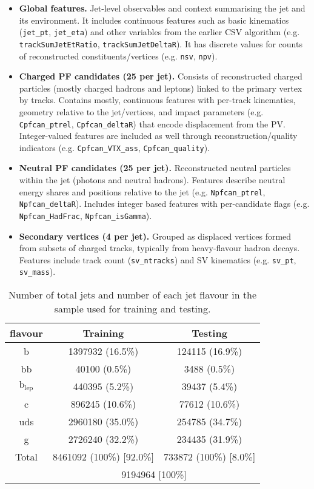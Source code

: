 \begin{itemize}
  \item \textbf{Global features.} Jet-level observables and context summarising the jet and its environment. It includes continuous features such as basic kinematics (\texttt{jet\_pt}, \texttt{jet\_eta}) and other variables from the earlier CSV algorithm (e.g. \texttt{trackSumJetEtRatio}, \texttt{trackSumJetDeltaR}). It has discrete values for counts of reconstructed constituents/vertices (e.g. \texttt{nsv}, \texttt{npv}).
  \item \textbf{Charged PF candidates (25 per jet).} Consists of reconstructed charged particles (mostly charged hadrons and leptons) linked to the primary vertex by tracks. Contains mostly, continuous features with per-track kinematics, geometry relative to the jet/vertices, and impact parameters (e.g. \texttt{Cpfcan\_ptrel},  \texttt{Cpfcan\_deltaR}) that encode displacement from the PV. Integer-valued features are included as well through reconstruction/quality indicators (e.g. \texttt{Cpfcan\_VTX\_ass}, \texttt{Cpfcan\_quality}).
  \item \textbf{Neutral PF candidates (25 per jet).} Reconstructed neutral particles within the jet (photons and neutral hadrons). Features describe neutral energy shares and positions relative to the jet (e.g. \texttt{Npfcan\_ptrel}, \texttt{Npfcan\_deltaR}). Includes integer based features with per-candidate flags (e.g. \texttt{Npfcan\_HadFrac}, \texttt{Npfcan\_isGamma}).
  \item \textbf{Secondary vertices (4 per jet).} Grouped as displaced vertices formed from subsets of charged tracks, typically from heavy-flavour hadron decays. Features include track count (\texttt{sv\_ntracks}) and SV kinematics (e.g. \texttt{sv\_pt}, \texttt{sv\_mass}).
\end{itemize}

\begin{table}[ht]
\centering
\caption{Number of total jets and number of each jet flavour in the sample used for training and testing.}
\begin{tabular}{|c|c|c|}
\hline
\textbf{flavour} & \textbf{Training} & \textbf{Testing} \\
\hline
b                       & 1397932 (16.5\%) & 124115 (16.9\%)\\
bb                      & 40100   (0.5\%)  & 3488   (0.5\%)\\
$\text{b}_{\text{lep}}$ & 440395  (5.2\%)  & 39437  (5.4\%)\\
c                       & 896245  (10.6\%) & 77612  (10.6\%)\\
uds                     & 2960180 (35.0\%) & 254785 (34.7\%)\\
g                       & 2726240 (32.2\%) & 234435 (31.9\%)\\
\hline
Total & 8461092 (100\%) [92.0\%] & 733872 (100\%) [8.0\%] \\
\hline
      &    \multicolumn{2}{c|}{9194964 [100\%]}            \\
\hline
\end{tabular}
\label{tab:dataset}
\end{table}

